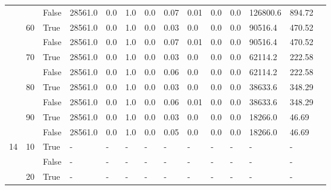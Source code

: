 \documentclass{article}
\begin{document}
\begin{landscape}
\begin{small}
\begin{longtable}[c]{@{}lll|ll|ll|ll|ll|lll@{}}
   &    & False & 28561.0         & 0.0            & 1.0           & 0.0           & 0.07          & 0.01          & 0.0           & 0.0           & 126800.6      & 894.72      &  \\
   & 60 & True  & 28561.0         & 0.0            & 1.0           & 0.0           & 0.03          & 0.0           & 0.0           & 0.0           & 90516.4       & 470.52      &  \\
   &    & False & 28561.0         & 0.0            & 1.0           & 0.0           & 0.07          & 0.01          & 0.0           & 0.0           & 90516.4       & 470.52      &  \\
   & 70 & True  & 28561.0         & 0.0            & 1.0           & 0.0           & 0.03          & 0.0           & 0.0           & 0.0           & 62114.2       & 222.58      &  \\
   &    & False & 28561.0         & 0.0            & 1.0           & 0.0           & 0.06          & 0.0           & 0.0           & 0.0           & 62114.2       & 222.58      &  \\
   & 80 & True  & 28561.0         & 0.0            & 1.0           & 0.0           & 0.03          & 0.0           & 0.0           & 0.0           & 38633.6       & 348.29      &  \\
   &    & False & 28561.0         & 0.0            & 1.0           & 0.0           & 0.06          & 0.01          & 0.0           & 0.0           & 38633.6       & 348.29      &  \\
   & 90 & True  & 28561.0         & 0.0            & 1.0           & 0.0           & 0.03          & 0.0           & 0.0           & 0.0           & 18266.0       & 46.69       &  \\
   &    & False & 28561.0         & 0.0            & 1.0           & 0.0           & 0.05          & 0.0           & 0.0           & 0.0           & 18266.0       & 46.69       &  \\
  \midrule
14 & 10 & True  & -               & -              & -             & -             & -             & -             & -             & -             & -             & -           &  \\
   &    & False & -               & -              & -             & -             & -             & -             & -             & -             & -             & -           &  \\
   & 20 & True  & -               & -              & -             & -             & -             & -             & -             & -             & -             & -           &  \\

\end{longtable}
\end{small}
\end{landscape}
\end{document}
